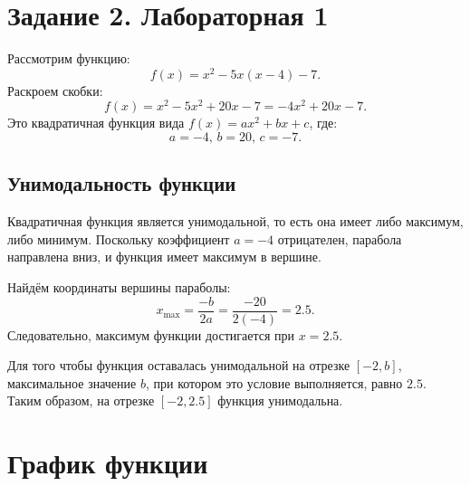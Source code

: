 \documentclass[a4paper,12pt]{article}
\begin{document}
\section*{Задание 2. Лабораторная 1}

Рассмотрим функцию:
\[
f(x) = x^2 - 5x(x - 4) - 7.
\]
Раскроем скобки:
\[
f(x) = x^2 - 5x^2 + 20x - 7 = -4x^2 + 20x - 7.
\]
Это квадратичная функция вида \( f(x) = ax^2 + bx + c \), где:
\[
a = -4, \, b = 20, \, c = -7.
\]

\subsection*{Унимодальность функции}
Квадратичная функция является унимодальной, то есть она имеет либо максимум, либо минимум. Поскольку коэффициент \( a = -4 \) отрицателен, парабола направлена вниз, и функция имеет максимум в вершине.

Найдём координаты вершины параболы:
\[
x_{\text{max}} = \frac{-b}{2a} = \frac{-20}{2(-4)} = 2.5.
\]
Следовательно, максимум функции достигается при \( x = 2.5 \).

Для того чтобы функция оставалась унимодальной на отрезке \( [-2, b] \), максимальное значение \( b \), при котором это условие выполняется, равно \( 2.5 \). Таким образом, на отрезке \( [-2, 2.5] \) функция унимодальна.

\section*{График функции}

\begin{center}
\end{center}
\end{document}
